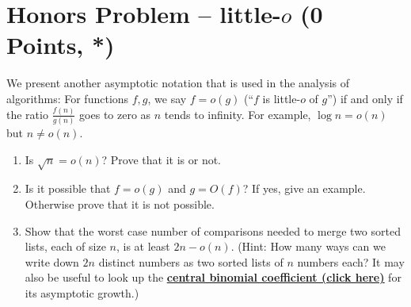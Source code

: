 \section*{Honors Problem -- little-$o$ (0 Points, *)}
We present another asymptotic notation that is used in the analysis of algorithms: For functions $f, g$, we say $f = o(g)$ (``$f$ is little-$o$ of $g$'') if and only if the ratio $\frac{f(n)}{g(n)}$ goes to zero as $n$ tends to infinity. For example, $\log n = o(n)$ but $n\neq o(n)$. 
\begin{enumerate}
    \item Is $\sqrt{n}=o(n)$? Prove that it is or not.
    \begin{solution}
        \vspace{3cm}
    \end{solution}

\newpage
    
    \item Is it possible that $f=o(g)$ and $g=O(f)$? If yes, give an example. Otherwise prove that it is not possible.
    \begin{solution}
        \vspace{4cm}
    \end{solution}
    \item Show that the worst case number of comparisons needed to merge two sorted lists, each of size $n$, is at least $2n-o(n)$.
        \newline
    (Hint: How many ways can we write down $2n$ distinct numbers as two sorted lists of $n$ numbers each? It may also be useful to look up the \href{https://en.wikipedia.org/wiki/Central_binomial_coefficient#Asymptotic_growth}{\underline{\textbf{central binomial coefficient (click here)}}} for its asymptotic growth.)
    \begin{solution}
        \vspace{6cm}
    \end{solution}
\end{enumerate}

